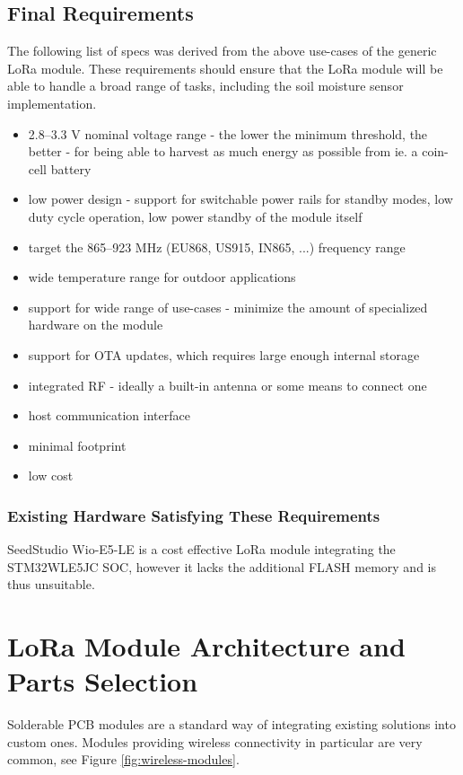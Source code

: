 \subsection{\label{section:final-requirements}Final Requirements}
The following list of specs was derived from the above use-cases of the generic LoRa module. These requirements should ensure that the LoRa module will be able to handle a broad range of tasks, including the soil moisture sensor implementation.
\begin{itemize}
    \item 2.8--3.3 V nominal voltage range - the lower the minimum threshold, the better - for being able to harvest as much energy as possible from ie. a coin-cell battery
    \item low power design - support for switchable power rails for standby modes, low duty cycle operation, low power standby of the module itself
    \item target the 865--923 MHz (EU868, US915, IN865, ...) frequency range
    \item wide temperature range for outdoor applications
    \item support for wide range of use-cases - minimize the amount of specialized hardware on the module
    \item support for OTA updates, which requires large enough internal storage
    \item integrated RF - ideally a built-in antenna or some means to connect one
    \item host communication interface
    \item minimal footprint
    \item low cost
\end{itemize}

\subsubsection{Existing Hardware Satisfying These Requirements}
SeedStudio Wio-E5-LE \cite{stmicroelectronics_lora_2024, seeedstudio_wio-e5-wireless_2024} is a cost effective LoRa module integrating the STM32WLE5JC SOC, however it lacks the additional FLASH memory and is thus unsuitable.

\section{\label{section:module-architecture}LoRa Module Architecture and Parts Selection}
Solderable PCB modules are a standard way of integrating existing solutions into custom ones. Modules providing wireless connectivity in particular are very common, see Figure \ref{fig:wireless-modules}.

